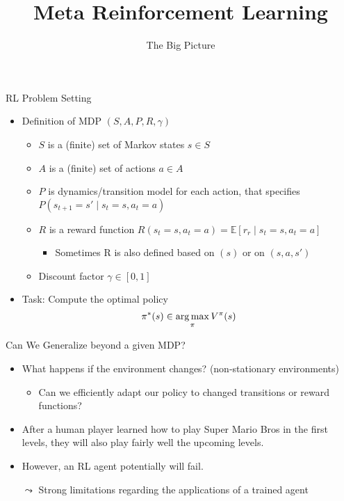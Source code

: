 


\title[Meta-RL]{Meta Reinforcement Learning}
\subtitle{The Big Picture}



	
	\maketitle

\begin{frame}[c]{RL Problem Setting}

\begin{itemize}
	\item Definition of MDP $(S,A,P, R, \gamma)$
	\begin{itemize}
		\item $S$ is a (finite) set of Markov states $s \in S$
		\item $A$ is a (finite) set of actions $a \in A$
		\item $P$ is dynamics/transition model for each action, that specifies $P(s_{t+1} = s' \mid s_t=s, a_t=a)$
		\item $R$ is a reward function 
		$R(s_t=s, a_t=a) = \mathbb{E}[r_r \mid s_t=s, a_t=a] $
		\begin{itemize}
			\item Sometimes R is also defined based on $(s)$ or on $(s,a,s')$
		\end{itemize}
		\item Discount factor $\gamma \in [0, 1]$
	\end{itemize}
	\bigskip
	\item Task: Compute the optimal policy
		$$ \pi^*(s)  \in \operatorname*{arg\,max}_\pi V^\pi(s)$$
\end{itemize}


\end{frame}
\begin{frame}[c]{Can We Generalize beyond a given MDP?}
	
	\begin{itemize}
		\item What happens if the environment changes? (non-stationary environments)
		\begin{itemize}
			\item Can we efficiently adapt our policy to changed transitions or reward functions?
		\end{itemize}
		\smallskip
		\item After a human player learned how to play Super Mario Bros in the first levels, they will also play fairly well the upcoming levels.
		\item However, an RL agent potentially will fail.
		\item[$\leadsto$] Strong limitations regarding the applications of a trained agent
	\end{itemize}
	
\end{frame}
